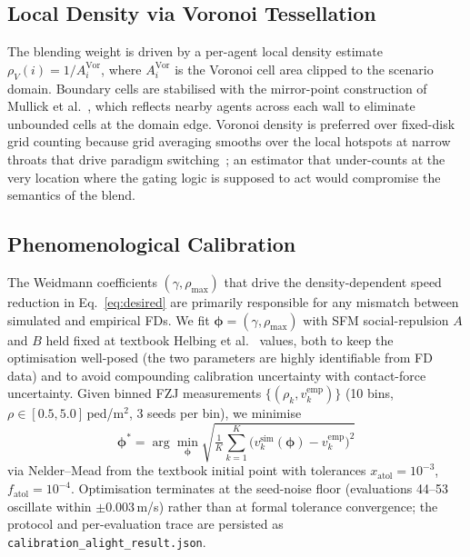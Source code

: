\documentclass[a4paper,twoside]{article}
\begin{document}
\subsection{Local Density via Voronoi Tessellation}
\label{sec:density}

The blending weight is driven by a per-agent local density estimate $\rho_V(i) = 1/A_i^{\text{Vor}}$, where $A_i^{\text{Vor}}$ is the Voronoi cell area clipped to the scenario domain. Boundary cells are stabilised with the mirror-point construction of Mullick et al.~\cite{Mullick24}, which reflects nearby agents across each wall to eliminate unbounded cells at the domain edge. Voronoi density is preferred over fixed-disk grid counting because grid averaging smooths over the local hotspots at narrow throats that drive paradigm switching~\cite{Steffen10}; an estimator that under-counts at the very location where the gating logic is supposed to act would compromise the semantics of the blend.

\subsection{Phenomenological Calibration}
\label{sec:calibration}

The Weidmann coefficients $(\gamma,\rho_{\max})$ that drive the density-dependent speed reduction in Eq.~\eqref{eq:desired} are primarily responsible for any mismatch between simulated and empirical FDs. We fit $\boldsymbol{\phi}=(\gamma,\rho_{\max})$ with SFM social-repulsion $A$ and $B$ held fixed at textbook Helbing et al.~\cite{Helbing00} values, both to keep the optimisation well-posed (the two parameters are highly identifiable from FD data) and to avoid compounding calibration uncertainty with contact-force uncertainty. Given binned FZJ measurements $\{(\rho_k,v_k^{\text{emp}})\}$ (10 bins, $\rho\in[0.5,5.0]$\,ped/m$^2$, 3 seeds per bin), we minimise
\begin{equation}\label{eq:calibration}
\boldsymbol{\phi}^* = \arg\min_{\boldsymbol{\phi}} \sqrt{\tfrac{1}{K}\sum_{k=1}^{K}\!\bigl(v_k^{\text{sim}}(\boldsymbol{\phi})-v_k^{\text{emp}}\bigr)^2}
\end{equation}
via Nelder--Mead from the textbook initial point with tolerances $x_{\text{atol}}{=}10^{-3}$, $f_{\text{atol}}{=}10^{-4}$. Optimisation terminates at the seed-noise floor (evaluations 44--53 oscillate within $\pm 0.003$\,m/s) rather than at formal tolerance convergence; the protocol and per-evaluation trace are persisted as \texttt{calibration\_alight\_result.json}.
\end{document}
